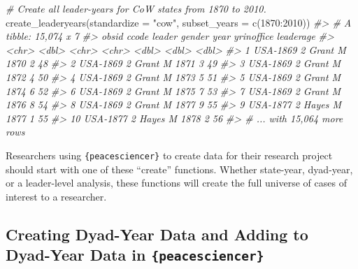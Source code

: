 \documentclass[
  11pt,
]{article}
\newenvironment{Shaded}{\begin{snugshade}}{\end{snugshade}}
\newcommand{\AttributeTok}[1]{\textcolor[rgb]{0.77,0.63,0.00}{#1}}
\newcommand{\CommentTok}[1]{\textcolor[rgb]{0.56,0.35,0.01}{\textit{#1}}}
\newcommand{\DecValTok}[1]{\textcolor[rgb]{0.00,0.00,0.81}{#1}}
\newcommand{\FunctionTok}[1]{\textcolor[rgb]{0.00,0.00,0.00}{#1}}
\newcommand{\NormalTok}[1]{#1}
\newcommand{\SpecialCharTok}[1]{\textcolor[rgb]{0.00,0.00,0.00}{#1}}
\newcommand{\StringTok}[1]{\textcolor[rgb]{0.31,0.60,0.02}{#1}}
\begin{document}
\begin{Shaded}
\begin{Highlighting}[]
\CommentTok{\# Create all leader{-}years for CoW states from 1870 to 2010.}
\FunctionTok{create\_leaderyears}\NormalTok{(}\AttributeTok{standardize =} \StringTok{"cow"}\NormalTok{, }\AttributeTok{subset\_years =} \FunctionTok{c}\NormalTok{(}\DecValTok{1870}\SpecialCharTok{:}\DecValTok{2010}\NormalTok{))}
\CommentTok{\#\textgreater{} \# A tibble: 15,074 x 7}
\CommentTok{\#\textgreater{}    obsid    ccode leader gender  year yrinoffice leaderage}
\CommentTok{\#\textgreater{}    \textless{}chr\textgreater{}    \textless{}dbl\textgreater{} \textless{}chr\textgreater{}  \textless{}chr\textgreater{}  \textless{}dbl\textgreater{}      \textless{}dbl\textgreater{}     \textless{}dbl\textgreater{}}
\CommentTok{\#\textgreater{}  1 USA{-}1869     2 Grant  M       1870          2        48}
\CommentTok{\#\textgreater{}  2 USA{-}1869     2 Grant  M       1871          3        49}
\CommentTok{\#\textgreater{}  3 USA{-}1869     2 Grant  M       1872          4        50}
\CommentTok{\#\textgreater{}  4 USA{-}1869     2 Grant  M       1873          5        51}
\CommentTok{\#\textgreater{}  5 USA{-}1869     2 Grant  M       1874          6        52}
\CommentTok{\#\textgreater{}  6 USA{-}1869     2 Grant  M       1875          7        53}
\CommentTok{\#\textgreater{}  7 USA{-}1869     2 Grant  M       1876          8        54}
\CommentTok{\#\textgreater{}  8 USA{-}1869     2 Grant  M       1877          9        55}
\CommentTok{\#\textgreater{}  9 USA{-}1877     2 Hayes  M       1877          1        55}
\CommentTok{\#\textgreater{} 10 USA{-}1877     2 Hayes  M       1878          2        56}
\CommentTok{\#\textgreater{} \# ... with 15,064 more rows}
\end{Highlighting}
\end{Shaded}

Researchers using \texttt{\{peacesciencer\}} to create data for their research project should start with one of these ``create'' functions. Whether state-year, dyad-year, or a leader-level analysis, these functions will create the full universe of cases of interest to a researcher.

\hypertarget{creating-dyad-year-data-and-adding-to-dyad-year-data-in-peacesciencer}{%
\subsection{\texorpdfstring{Creating Dyad-Year Data and Adding to Dyad-Year Data in \texttt{\{peacesciencer\}}}{Creating Dyad-Year Data and Adding to Dyad-Year Data in \{peacesciencer\}}}\label{creating-dyad-year-data-and-adding-to-dyad-year-data-in-peacesciencer}}
\end{document}
